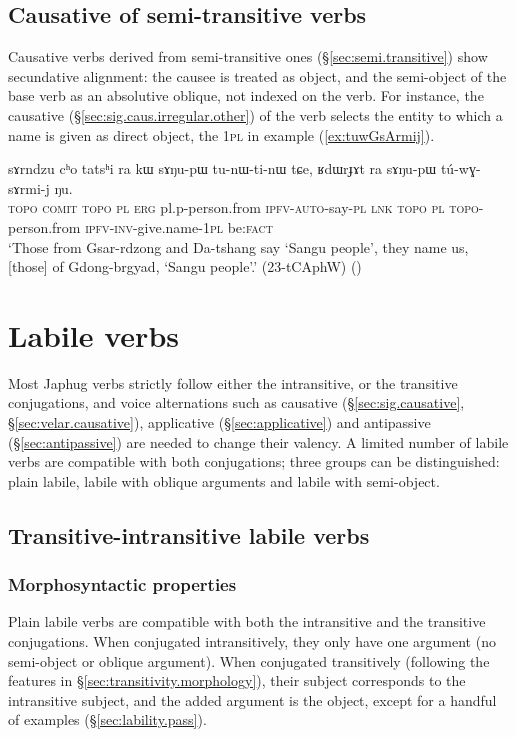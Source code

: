 \subsection{Causative of semi-transitive verbs} \label{sec:semi.transitive.causative}
Causative verbs derived from semi-transitive ones (§\ref{sec:semi.transitive}) show secundative alignment: the causee is treated as object, and the semi-object of the base verb as an absolutive oblique, not indexed on the verb. For instance, the causative  (§\ref{sec:sig.caus.irregular.other}) of the verb  selects the entity to which a name is given as direct object, the \textsc{1pl} in example (\ref{ex:tuwGsArmij}).

\begin{exe}
	\ex \label{ex:tuwGsArmij}
	\gll   sɤrndzu cʰo tatsʰi ra kɯ sɤŋu-pɯ tu-nɯ-ti-nɯ tɕe, ʁdɯrɟɤt ra sɤŋu-pɯ tú-wɣ-sɤrmi-j ŋu. \\
	\textsc{topo} \textsc{comit}  \textsc{topo} \textsc{pl} \textsc{erg} pl.p-person.from \textsc{ipfv}-\textsc{auto}-say-\textsc{pl} \textsc{lnk} \textsc{topo} \textsc{pl} \textsc{topo}-person.from \textsc{ipfv}-\textsc{inv}-give.name-\textsc{1pl} be:\textsc{fact} \\
	\glt `Those from Gsar-rdzong and Da-tshang say `Sangu people', they name us, [those] of Gdong-brgyad, `Sangu people'.' (23-tCAphW)
()
\end{exe}


\section{Labile verbs} \label{sec:lability}
Most Japhug verbs strictly follow either the intransitive, or the transitive conjugations, and voice alternations such as causative (§\ref{sec:sig.causative}, §\ref{sec:velar.causative}), applicative (§\ref{sec:applicative}) and antipassive (§\ref{sec:antipassive}) are needed to change their valency. A limited number of labile verbs are compatible with both conjugations; three groups can be distinguished: plain labile, labile with oblique arguments and labile with semi-object.

\subsection{Transitive-intransitive labile verbs} \label{sec:labile.tr-intr}

\subsubsection{Morphosyntactic properties} \label{sec:lability.morphosyntax}
Plain labile verbs are compatible with both the intransitive and the transitive conjugations. When conjugated intransitively, they only have one argument (no semi-object or oblique argument). When conjugated transitively (following the features in §\ref{sec:transitivity.morphology}), their subject corresponds to the intransitive subject, and the added argument is the object, except for a handful of examples (§\ref{sec:lability.pass}).

